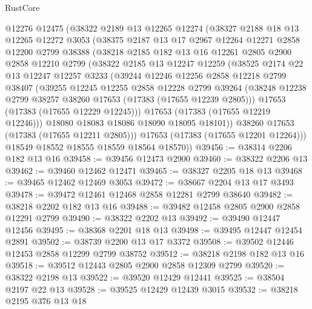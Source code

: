 \begin{lexlean}{RustCore}
\begin{coremodule}
    @12276
    @12475
    (@38322
      @2189
      @13
      @12265
      @12274
      (@38327
        @2188
        @18
        @13
        @12265
        @12272
        @3053
        (@38375
          @2187
          @13
          @17
          @2967
          @12264
          @12271
          @2858
          @12200
          @2799
          @38388
          (@38218
            @2185
            @182
            @13
            @16
            @12261
            @2805
            @2900
            @2858
            @12210
            @2799
            (@38322
              @2185
              @13
              @12247
              @12259
              (@38525
                @2174
                @22
                @13
                @12247
                @12257
                @3233
                (@39244
                  @12246
                  @12256
                  @2858
                  @12218
                  @2799
                  @38407
                  (@39255
                    @12245
                    @12255
                    @2858
                    @12228
                    @2799
                    @39264
                    (@38248 @12238 @2799 @38257 @38260 @17653 (@17383 (@17655 @12239 @2805)))
                    @17653
                    (@17383 (@17655 @12229 @12245)))
                  @17653
                  (@17383 (@17655 @12219 @12246)))
                @18080
                @18083
                @18086
                @18090
                @18095
                @18101))
            @38260
            @17653
            (@17383 (@17655 @12211 @2805)))
          @17653
          (@17383 (@17655 @12201 @12264)))
        @18549
        @18552
        @18555
        @18559
        @18564
        @18570))
@39456 := @38314 @2206 @182 @13 @16
@39458 := @39456 @12473 @2900
@39460 := @38322 @2206 @13
@39462 := @39460 @12462 @12471
@39465 := @38327 @2205 @18 @13
@39468 := @39465 @12462 @12469 @3053
@39472 := @38667 @2204 @13 @17 @3493
@39478 := @39472 @12461 @12468 @2858 @12281 @2799 @38640
@39482 := @38218 @2202 @182 @13 @16
@39488 := @39482 @12458 @2805 @2900 @2858 @12291 @2799
@39490 := @38322 @2202 @13
@39492 := @39490 @12447 @12456
@39495 := @38368 @2201 @18 @13
@39498 := @39495 @12447 @12454 @2891
@39502 := @38739 @2200 @13 @17 @3372
@39508 := @39502 @12446 @12453 @2858 @12299 @2799 @38752
@39512 := @38218 @2198 @182 @13 @16
@39518 := @39512 @12443 @2805 @2900 @2858 @12309 @2799
@39520 := @38322 @2198 @13
@39522 := @39520 @12429 @12441
@39525 := @38504 @2197 @22 @13
@39528 := @39525 @12429 @12439 @3015
@39532 := @38218 @2195 @376 @13 @18

\end{coremodule}
\end{lexlean}
